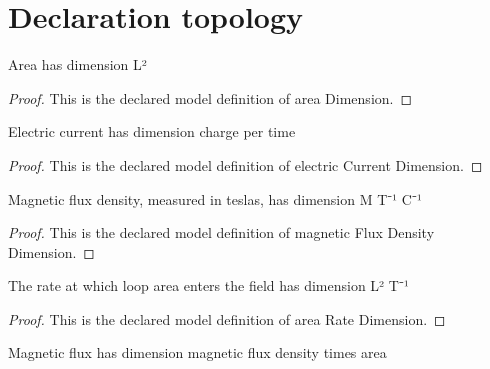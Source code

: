\section{Declaration topology}
\begin{definition}
  \label{def:physics:phyx-mini-0973:phyxminiproblems-problemphyxmini0973-areadimension}
  Area has dimension L²
\end{definition}
\begin{proof}
  This is the declared model definition of area Dimension.
\end{proof}
\begin{definition}
  \label{def:physics:phyx-mini-0973:phyxminiproblems-problemphyxmini0973-electriccurrentdimension}
  Electric current has dimension charge per time
\end{definition}
\begin{proof}
  This is the declared model definition of electric Current Dimension.
\end{proof}
\begin{definition}
  \label{def:physics:phyx-mini-0973:phyxminiproblems-problemphyxmini0973-magneticfluxdensitydimension}
  Magnetic flux density, measured in teslas, has dimension M T⁻¹ C⁻¹
\end{definition}
\begin{proof}
  This is the declared model definition of magnetic Flux Density Dimension.
\end{proof}
\begin{definition}
  \label{def:physics:phyx-mini-0973:phyxminiproblems-problemphyxmini0973-arearatedimension}
  The rate at which loop area enters the field has dimension L² T⁻¹
\end{definition}
\begin{proof}
  This is the declared model definition of area Rate Dimension.
\end{proof}
\begin{definition}
  \label{def:physics:phyx-mini-0973:phyxminiproblems-problemphyxmini0973-magneticfluxdimension}
  Magnetic flux has dimension magnetic flux density times area
\end{definition}
